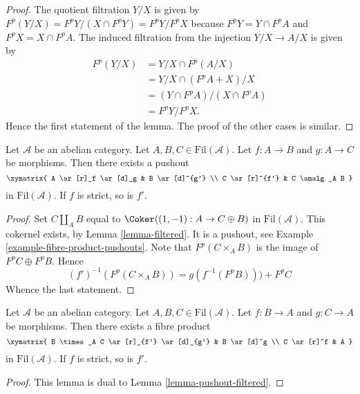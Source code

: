 \begin{proof}
The quotient filtration $Y/X$ is given by
$F^p(Y/X) = F^pY/(X \cap F^pY) = F^pY/F^pX$
because $F^pY = Y \cap F^pA$ and $F^pX = X \cap F^pA$.
The induced filtration from the injection $Y/X \to A/X$ is given by
\begin{align*}
F^p(Y/X) & = Y/X \cap F^p(A/X) \\
& = Y/X \cap (F^pA + X)/X \\
& = (Y \cap F^pA)/(X \cap F^pA) \\
& = F^pY/F^pX.
\end{align*}
Hence the first statement of the lemma.
The proof of the other cases is similar.
\end{proof}

\begin{lemma}
\label{lemma-pushout-filtered}
Let $\mathcal{A}$ be an abelian category.
Let $A, B, C \in \text{Fil}(\mathcal{A})$.
Let $f : A \to B$ and $g : A \to C$ be morphisms.
Then there exists a pushout
$$
\xymatrix{
A \ar[r]_f \ar[d]_g & B \ar[d]^{g'} \\
C \ar[r]^{f'} & C \amalg_A B
}
$$
in $\text{Fil}(\mathcal{A})$. If $f$ is strict, so is $f'$.
\end{lemma}

\begin{proof}
Set $C \amalg_A B$ equal to $\Coker((1, -1) : A \to C \oplus B)$
in $\text{Fil}(\mathcal{A})$. This cokernel exists, by
Lemma \ref{lemma-filtered}.
It is a pushout, see
Example \ref{example-fibre-product-pushouts}.
Note that $F^p(C \times_A B)$ is the image of $F^pC \oplus F^pB$.
Hence
$$
(f')^{-1}(F^p(C \times_A B)) = g(f^{-1}(F^pB))) + F^pC
$$
Whence the last statement.
\end{proof}

\begin{lemma}
\label{lemma-fibre-product-filtered}
Let $\mathcal{A}$ be an abelian category.
Let $A, B, C \in \text{Fil}(\mathcal{A})$.
Let $f : B \to A$ and $g : C \to A$ be morphisms.
Then there exists a fibre product
$$
\xymatrix{
B \times_A C \ar[r]_{f'} \ar[d]_{g'} & B \ar[d]^g \\
C \ar[r]^f & A
}
$$
in $\text{Fil}(\mathcal{A})$. If $f$ is strict, so is $f'$.
\end{lemma}

\begin{proof}
This lemma is dual to
Lemma \ref{lemma-pushout-filtered}.
\end{proof}

